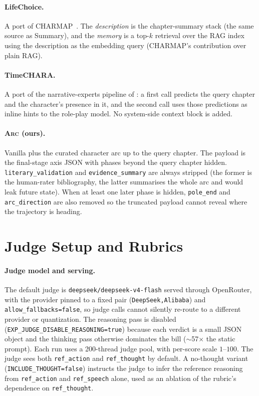 \documentclass[11pt]{article}
\begin{document}
\paragraph{LifeChoice.}
A port of CHARMAP~\cite{xu-etal-2025-characterisdestiny}. The \emph{description} is the chapter-summary stack (the same source as Summary), and the \emph{memory} is a top-$k$ retrieval over the RAG index using the description as the embedding query (CHARMAP's contribution over plain RAG).

\paragraph{TimeCHARA.}
A port of the narrative-experts pipeline of \citet{ahn-etal-2024-timechara}: a first call predicts the query chapter and the character's presence in it, and the second call uses those predictions as inline hints to the role-play model. No system-side context block is added.

\paragraph{\textsc{Arc} (ours).}
Vanilla plus the curated character arc up to the query chapter. The payload is the final-stage axis JSON with phases beyond the query chapter hidden. \texttt{literary\_validation} and \texttt{evidence\_summary} are always stripped (the former is the human-rater bibliography, the latter summarises the whole arc and would leak future state). When at least one later phase is hidden, \texttt{pole\_end} and \texttt{arc\_direction} are also removed so the truncated payload cannot reveal where the trajectory is heading.

\section{Judge Setup and Rubrics\label{app:judge}}

\paragraph{Judge model and serving.}
The default judge is \texttt{deepseek/deepseek-v4-flash} served through OpenRouter, with the provider pinned to a fixed pair (\texttt{DeepSeek,Alibaba}) and \texttt{allow\_fallbacks=false}, so judge calls cannot silently re-route to a different provider or quantization. The reasoning pass is disabled (\texttt{EXP\_JUDGE\_DISABLE\_REASONING=true}) because each verdict is a small JSON object and the thinking pass otherwise dominates the bill ($\sim$57$\times$ the static prompt). Each run uses a 200-thread judge pool, with per-score scale $1$--$100$. The judge sees both \texttt{ref\_action} and \texttt{ref\_thought} by default. A no-thought variant (\texttt{INCLUDE\_THOUGHT=false}) instructs the judge to infer the reference reasoning from \texttt{ref\_action} and \texttt{ref\_speech} alone, used as an ablation of the rubric's dependence on \texttt{ref\_thought}.
\end{document}

